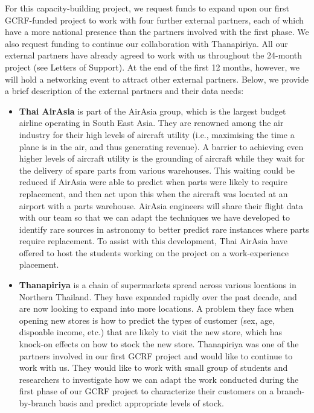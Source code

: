 \documentclass[11pt]{article}
\begin{document}
  For this capacity-building project, we request funds to expand upon our first GCRF-funded project to work with four further external partners, each of which have a more national presence than the partners involved with the first phase. We also request funding to continue our collaboration with Thanapiriya. All our external partners have already agreed to work with us throughout the 24-month project (see Letters of Support). At the end of the first 12 months, however, we will hold a networking event to attract other external partners. Below, we provide a brief description of the external partners and their data needs:
  
  \begin{itemize}
  \item {\bf Thai AirAsia} is part of the AirAsia group, which is the largest budget airline operating in South East Asia. They are renowned among the air industry for their high levels of aircraft utility (i.e., maximising the time a plane is in the air, and thus generating revenue). A barrier to achieving even higher levels of aircraft utility is the grounding of aircraft while they wait for the delivery of spare parts from various warehouses. This waiting could be reduced if AirAsia were able to predict when parts were likely to require replacement, and then act upon this when the aircraft was located at an airport with a parts warehouse. AirAsia engineers will share their flight data with our team so that we can adapt the techniques we have developed to identify rare sources in astronomy to better predict rare instances where parts require replacement. To assist with this development, Thai AirAsia have offered to host the students working on the project on a work-experience placement.
  \item {\bf Thanapiriya} is a chain of supermarkets spread across various locations in Northern Thailand. They have expanded rapidly over the past decade, and are now looking to expand into more locations. A problem they face when opening new stores is how to predict the types of customer (sex, age, dispoable income, etc.) that are likely to visit the new store, which has knock-on effects on how to stock the new store. Thanapiriya was one of the partners involved in our first GCRF project and would like to continue to work with us. They would like to work with small group of students and researchers to investigate how we can adapt the work conducted during the first phase of our GCRF project to characterize their customers on a branch-by-branch basis and predict appropriate levels of stock.

\end{itemize}
\end{document}
